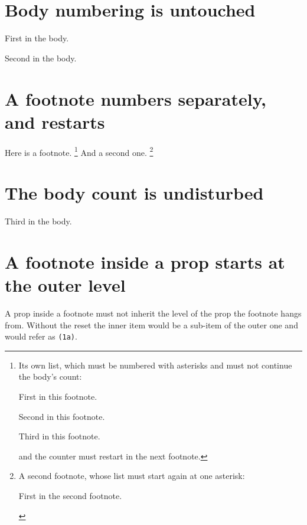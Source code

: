 \documentclass{article}
\begin{document}
\section{Body numbering is untouched}

\begin{prop}
  \item First in the body. \label{b:1}
  \item Second in the body. \label{b:2}
\end{prop}

\section{A footnote numbers separately, and restarts}

Here is a footnote.%
\footnote{Its own list, which must be numbered with asterisks and must not
  continue the body's count:
  \begin{prop}
    \item First in this footnote. \label{f1:1}
    \item Second in this footnote. \label{f1:2}
    \item Third in this footnote. \label{f1:3}
  \end{prop}
  and the counter must restart in the next footnote.}
And a second one.%
\footnote{A second footnote, whose list must start again at one asterisk:
  \begin{prop}
    \item First in the second footnote. \label{f2:1}
  \end{prop}}

\section{The body count is undisturbed}

\begin{prop}
  \item Third in the body. \label{b:3}
\end{prop}

\section{A footnote inside a prop starts at the outer level}

A prop inside a footnote must not inherit the level of the prop the footnote
hangs from.  Without the reset the inner item would be a sub-item of the outer
one and would refer as \texttt{(1a)}.
\end{document}
